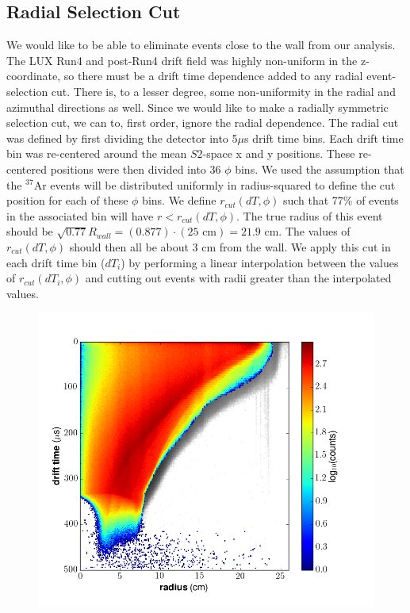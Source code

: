 {\subsection{Radial Selection Cut}
We would like to be able to eliminate events close to the wall from our analysis. The LUX Run4 and post-Run4 drift field was highly non-uniform in the z-coordinate, so there must be a drift time dependence added to any radial event-selection cut. There is, to a lesser degree, some non-uniformity in the radial and azimuthal directions as well. Since we would like to make a radially symmetric selection cut, we can to, first order, ignore the radial dependence. The radial cut was defined by first dividing the detector into 5$\mu$s drift time bins. Each drift time bin was re-centered around the mean $S2$-space x and y positions. These re-centered positions were then divided into 36 $\phi$ bins. We used the assumption that the $^{37}$Ar events will be distributed uniformly in radius-squared to define the cut position for each of these $\phi$ bins. We define $r_{cut}(dT,\phi)$ such that 77\% of events in the associated bin will have $r<r_{cut}(dT,\phi)$. The true radius of this event should be $\sqrt{0.77}R_{wall}=(0.877)\cdot (25 \text{\ cm})=21.9 \text{\ cm}$. The values of $r_{cut}(dT,\phi)$ should then all be about 3 cm from the wall. We apply this cut in each drift time bin ($dT_i$) by performing a linear interpolation between the values of $r_{cut}(dT_i,\phi)$ and cutting out events with radii greater than the interpolated values.
\begin{figure}[h!]
\centering
  \includegraphics[width=\textwidth]{Figures/xycut_dt.png}

\end{figure}}
